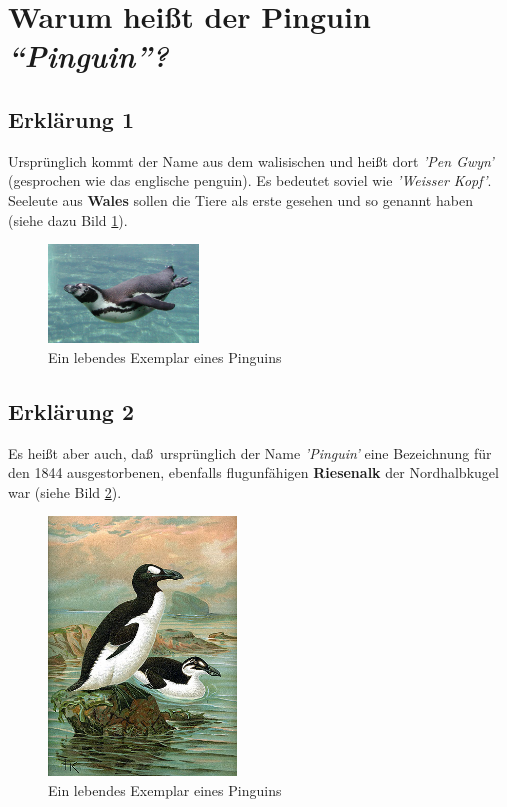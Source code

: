 \documentclass[a4paper, pdftex, ngerman, 11pt]{article}
\begin{document}
\section{Warum heißt der Pinguin \emph{"`Pinguin"'?}}
\subsection{Erklärung 1}
Ursprünglich kommt der Name aus dem walisischen und heißt dort \emph{'Pen Gwyn'} (gesprochen wie das englische penguin). Es bedeutet soviel wie \emph{'Weisser Kopf'}. Seeleute aus \textbf{Wales} sollen die Tiere als erste gesehen und so genannt haben (siehe dazu Bild \ref{img:pen}).

\begin{figure}[H]
\begin{center}
\includegraphics[width=4cm]{bilder/swim-Ping.jpg}
\caption{Ein lebendes Exemplar eines Pinguins}
\label{img:pen}
\end{center}
\end{figure}

\subsection{Erklärung 2}
Es heißt aber auch, da\ss \ ursprünglich der Name \emph{'Pinguin'} eine Bezeichnung für den 1844 ausgestorbenen, ebenfalls flugunfähigen \textbf{Riesenalk} der Nordhalbkugel war (siehe Bild \ref{img:auk}).

\begin{figure}[H]
\begin{center}
\includegraphics[width=5cm]{bilder/GreatAuk.jpg}
\caption{Ein lebendes Exemplar eines Pinguins}
\label{img:auk}
\end{center}
\end{figure}
\end{document}
